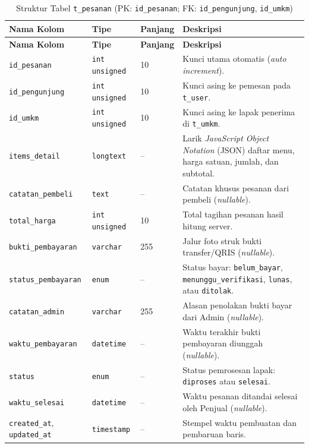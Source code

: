 \renewcommand{\arraystretch}{1.20}
\begin{longtable}{|L{3.85cm}|L{2.4cm}|C{1.65cm}|L{\dimexpr\textwidth-3.85cm-2.4cm-1.65cm-8\arrayrulewidth\relax}|}
\caption{Struktur Tabel \texttt{t\_pesanan} (PK: \texttt{id\_pesanan}; FK: \texttt{id\_pengunjung}, \texttt{id\_umkm})}
\label{tab:skema-pesanan} \\
\hline
{}
\textbf{Nama Kolom} & \textbf{Tipe} & \textbf{Panjang} & \textbf{Deskripsi} \\
\hline
\endfirsthead
\hline
{}
\textbf{Nama Kolom} & \textbf{Tipe} & \textbf{Panjang} & \textbf{Deskripsi} \\
\hline
\endhead
\hline
\endfoot
\texttt{id\_pesanan} & \texttt{int unsigned} & 10 & Kunci utama otomatis (\textit{auto increment}). \\
\hline
\texttt{id\_pengunjung} & \texttt{int unsigned} & 10 & Kunci asing ke pemesan pada \texttt{t\_user}. \\
\hline
\texttt{id\_umkm} & \texttt{int unsigned} & 10 & Kunci asing ke lapak penerima di \texttt{t\_umkm}. \\
\hline
\texttt{items\_detail} & \texttt{longtext} & -- & Larik \textit{JavaScript Object Notation} (JSON) daftar menu, harga satuan, jumlah, dan subtotal. \\
\hline
\texttt{catatan\_pembeli} & \texttt{text} & -- & Catatan khusus pesanan dari pembeli (\textit{nullable}). \\
\hline
\texttt{total\_harga} & \texttt{int unsigned} & 10 & Total tagihan pesanan hasil hitung server. \\
\hline
\texttt{bukti\_pembayaran} & \texttt{varchar} & 255 & Jalur foto struk bukti transfer/QRIS (\textit{nullable}). \\
\hline
\texttt{status\_pembayaran} & \texttt{enum} & -- & Status bayar: \texttt{belum\_bayar}, \texttt{menunggu\_\allowbreak verifikasi}, \texttt{lunas}, atau \texttt{ditolak}. \\
\hline
\texttt{catatan\_admin} & \texttt{varchar} & 255 & Alasan penolakan bukti bayar dari Admin (\textit{nullable}). \\
\hline
\texttt{waktu\_pembayaran} & \texttt{datetime} & -- & Waktu terakhir bukti pembayaran diunggah (\textit{nullable}). \\
\hline
\texttt{status} & \texttt{enum} & -- & Status pemrosesan lapak: \texttt{diproses} atau \texttt{selesai}. \\
\hline
\texttt{waktu\_selesai} & \texttt{datetime} & -- & Waktu pesanan ditandai selesai oleh Penjual (\textit{nullable}). \\
\hline
\texttt{created\_at}, \texttt{updated\_at} & \texttt{timestamp} & -- & Stempel waktu pembuatan dan pembaruan baris. \\
\hline
\end{longtable}

